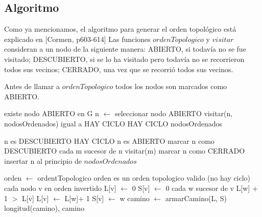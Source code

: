 \subsection{Algoritmo}
Como ya mencionamos, el algoritmo para generar el orden topol\'ogico est\'a explicado en [Cormen, p603-614]
Las funciones $ordenTopologico$ y $visitar$ consideran a un nodo de la siguiente manera:
ABIERTO, si todavía no se fue visitado; 
DESCUBIERTO, si se lo ha visitado pero todavía no se recorrieron todos sus vecinos;
CERRADO, una vez que se recorrió todos sus vecinos.

Antes de llamar a $ordenTopologico$ todos los nodos son marcados como ABIERTO. 


\begin{algorithm}[H]
\caption{} 
\label{pseudocodigo_ordenTopologico}
\begin{codebox}
\li \While existe nodo ABIERTO en G\Do
\li		n $\gets$ seleccionar nodo ABIERTO
\li		\If visitar(n, nodosOrdenados) igual a HAY CICLO 	\Do 
\li				\Return HAY CICLO
			\End
		\End
\li	\Return nodosOrdenados	  
	\End
\end{codebox}
\end{algorithm}


\begin{algorithm}[H]
\caption{} 
\begin{codebox}
\li {}	
\li \If n es DESCUBIERTO \Do
\li 	 \Return HAY CICLO
 		\End
\li \If n es ABIERTO \Do
\li 	marcar n como DESCUBIERTO
\li		\For cada m sucesor de n \Do
\li			visitar(m)			
			\End	
\li		marcar n como CERRADO
\li 		insertar n al principio de $nodosOrdenados$
\li 	\Return
 		\End
	\End
\end{codebox}
\end{algorithm}
 

\begin{algorithm}[H]
\caption{} 
\label{pseudocodigo_caminoMaximo}
\begin{codebox}
\li {}
\li orden $\gets$ ordentTopologico
\li \If orden es un orden topologico valido (no hay ciclo) \Do
\li		\For cada nodo v en orden invertido\Do
\li			L[v] $\gets$ 0
\li 		S[v] $\gets$ 0
\li			\For cada w sucesor de v \Do
\li		  	\If L[w] + 1 $>$ L[v] \Do
\li				L[v] $\gets$ L[w]+ 1
\li				S[v] $\gets$ w
					\End
				\End
			\End
\li 	camino $\gets$ armarCamino(L, S)
\li 	\Return longitud(camino), camino
		\End
\li \Else \Do
\li 	{}
		\End
	\End
\end{codebox}
\end{algorithm}


